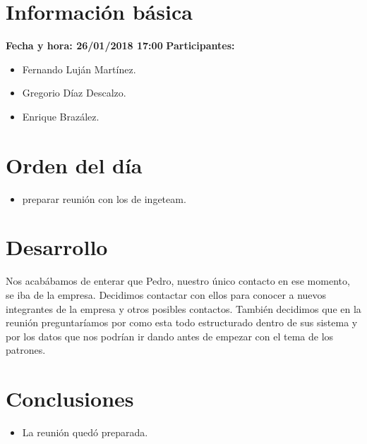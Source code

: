 \documentclass[a4paper]{article}
\begin{document}
\section{Información básica}
\textbf{Fecha y hora: 26/01/2018 17:00}
\newline
\textbf{Participantes:}
\begin{itemize}
	\item Fernando Luján Martínez.
    \item Gregorio Díaz Descalzo.
    \item Enrique Brazález.
\end{itemize}
\section{Orden del día}
\begin{itemize}
\item preparar reunión con los de ingeteam.
\end{itemize}
\section{Desarrollo}
Nos acabábamos de enterar que Pedro, nuestro único contacto en ese momento, se iba de la empresa. Decidimos contactar con ellos para conocer a nuevos integrantes de la empresa y otros posibles contactos. También decidimos que en la reunión preguntaríamos por como esta todo estructurado dentro de sus sistema y por los datos que nos podrían ir dando antes de empezar con el tema de los patrones.
\section{Conclusiones}
\begin{itemize}
\item La reunión quedó preparada.
\end{itemize}
\end{document}
